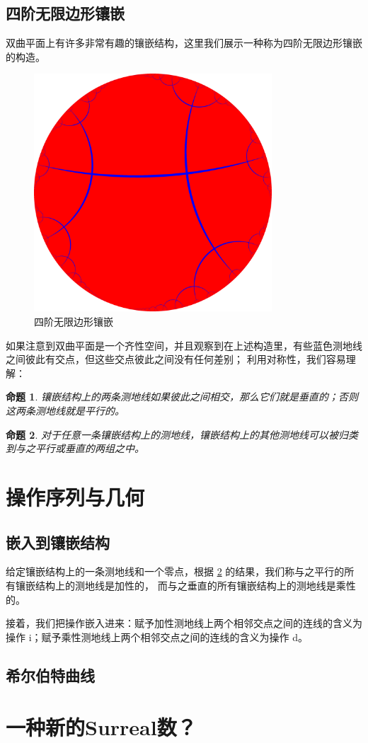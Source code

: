 \documentclass[a4paper,12pt]{article}
\newtheorem{proposition}{命题}
\begin{document}
\newpage

\subsection{四阶无限边形镶嵌}

双曲平面上有许多非常有趣的镶嵌结构，这里我们展示一种称为四阶无限边形镶嵌的构造。

\begin{figure}[ht]
\centering
\includegraphics[width=3.5in]{images/H2_tiling_24i-1.png}
\caption{四阶无限边形镶嵌}
\end{figure}

如果注意到双曲平面是一个齐性空间，并且观察到在上述构造里，有些蓝色测地线之间彼此有交点，但这些交点彼此之间没有任何差别；
利用对称性，我们容易理解：

\begin{proposition}
\label{A}
镶嵌结构上的两条测地线如果彼此之间相交，那么它们就是垂直的；否则这两条测地线就是平行的。
\end{proposition}

\begin{proposition}
\label{B}
对于任意一条镶嵌结构上的测地线，镶嵌结构上的其他测地线可以被归类到与之平行或垂直的两组之中。
\end{proposition}

\newpage

\section{操作序列与几何}

\subsection{嵌入到镶嵌结构}

给定镶嵌结构上的一条测地线和一个零点，根据 \ref{B} 的结果，我们称与之平行的所有镶嵌结构上的测地线是加性的，
而与之垂直的所有镶嵌结构上的测地线是乘性的。

接着，我们把操作嵌入进来：赋予加性测地线上两个相邻交点之间的连线的含义为操作 i；赋予乘性测地线上两个相邻交点之间的连线的含义为操作 d。





\subsection{希尔伯特曲线}

\section{一种新的Surreal数？}
\end{document}
